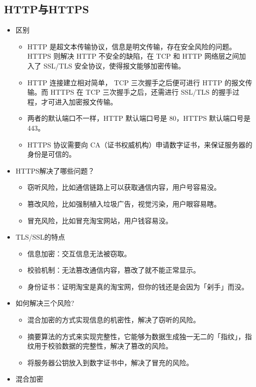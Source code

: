 \documentclass[11pt]{article}
\begin{document}
\subsection{HTTP与HTTPS}
\label{sec:org1ef5b10}
\begin{itemize}
\item 区别
\begin{itemize}
\item HTTP 是超文本传输协议，信息是明文传输，存在安全风险的问题。HTTPS 则解决 HTTP 不安全的缺陷，在 TCP 和 HTTP 网络层之间加入了 SSL/TLS 安全协议，使得报文能够加密传输。
\item HTTP 连接建立相对简单， TCP 三次握手之后便可进行 HTTP 的报文传输。而 HTTPS 在 TCP 三次握手之后，还需进行 SSL/TLS 的握手过程，才可进入加密报文传输。
\item 两者的默认端口不一样，HTTP 默认端口号是 80，HTTPS 默认端口号是 443。
\item HTTPS 协议需要向 CA（证书权威机构）申请数字证书，来保证服务器的身份是可信的。
\end{itemize}
\item HTTPS解决了哪些问题？
\begin{itemize}
\item 窃听风险，比如通信链路上可以获取通信内容，用户号容易没。
\item 篡改风险，比如强制植入垃圾广告，视觉污染，用户眼容易瞎。
\item 冒充风险，比如冒充淘宝网站，用户钱容易没。
\end{itemize}
\item TLS/SSL的特点
\begin{itemize}
\item 信息加密：交互信息无法被窃取。
\item 校验机制：无法篡改通信内容，篡改了就不能正常显示。
\item 身份证书：证明淘宝是真的淘宝网，但你的钱还是会因为「剁手」而没。
\end{itemize}
\item 如何解决三个风险?
\begin{itemize}
\item 混合加密的方式实现信息的机密性，解决了窃听的风险。
\item 摘要算法的方式来实现完整性，它能够为数据生成独一无二的「指纹」，指纹用于校验数据的完整性，解决了篡改的风险。
\item 将服务器公钥放入到数字证书中，解决了冒充的风险。
\end{itemize}
\item 混合加密
\begin{itemize}

\end{itemize}
\end{itemize}
\end{document}
